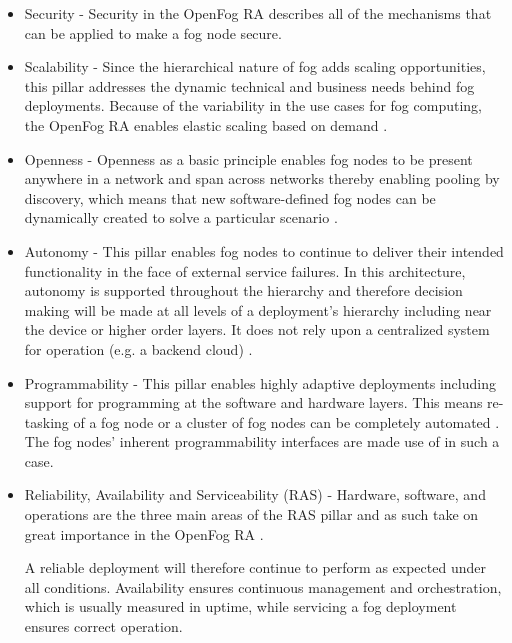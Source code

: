 \documentclass{article}
\begin{document}
\begin{itemize}
\item Security - Security in the OpenFog RA describes all of the mechanisms that can be applied to make a fog node secure. 

\item Scalability - Since the hierarchical nature of fog adds scaling opportunities, this pillar addresses the dynamic technical and business needs behind fog deployments. Because of the variability in the use cases for fog computing, the OpenFog RA enables elastic scaling based on demand \cite{openfogconsortium2017}.

\item Openness - Openness as a basic principle enables fog nodes to be present anywhere in a network and span across networks thereby enabling pooling by discovery, which means that new software-defined fog nodes can be dynamically created to solve a particular scenario \cite{openfogconsortium2017}.

\item Autonomy - This pillar enables fog nodes to continue to deliver their intended functionality in the face of external service failures. In this architecture, autonomy is supported throughout the hierarchy and therefore decision making will be made at all levels of a deployment’s hierarchy including near the device or higher order layers. It does not rely upon a centralized system for operation (e.g. a backend cloud) \cite{openfogconsortium2017}.

\item Programmability - This pillar enables highly adaptive deployments including support for programming at the software and hardware layers. This means re-tasking of a fog node or a cluster of fog nodes can be completely automated \cite{openfogconsortium2017}. The fog nodes' inherent programmability interfaces are made use of in such a case.

\item Reliability, Availability and Serviceability (RAS) - Hardware, software, and operations are the three main areas of the RAS pillar and as such take on great importance in the OpenFog RA \cite{openfogconsortium2017}.

A reliable deployment will therefore continue to perform as expected under all conditions. Availability ensures continuous management and orchestration, which is usually measured in uptime, while servicing a fog deployment ensures correct operation.


\end{itemize}
\end{document}
